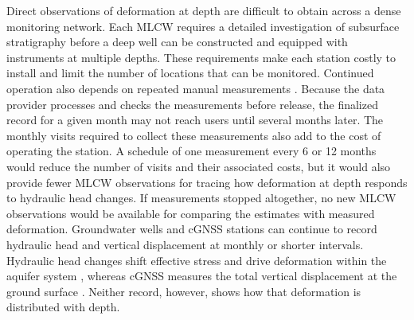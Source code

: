 Direct observations of deformation at depth are difficult to obtain across a dense monitoring network. Each MLCW requires a detailed investigation of subsurface stratigraphy before a deep well can be constructed and equipped with instruments at multiple depths. These requirements make each station costly to install and limit the number of locations that can be monitored. Continued operation also depends on repeated manual measurements \citep{hung_measuring_2021,hung2025_realtime}. Because the data provider processes and checks the measurements before release, the finalized record for a given month may not reach users until several months later. The monthly visits required to collect these measurements also add to the cost of operating the station. A schedule of one measurement every 6 or 12 months would reduce the number of visits and their associated costs, but it would also provide fewer MLCW observations for tracing how deformation at depth responds to hydraulic head changes. If measurements stopped altogether, no new MLCW observations would be available for comparing the estimates with measured deformation. Groundwater wells and cGNSS stations can continue to record hydraulic head and vertical displacement at monthly or shorter intervals. Hydraulic head changes shift effective stress and drive deformation within the aquifer system \citep{galloway_review_2011,chaussard_head_2014}, whereas cGNSS measures the total vertical displacement at the ground surface \citep{bock_physical_2016,yin_gps_2021}. Neither record, however, shows how that deformation is distributed with depth. %

